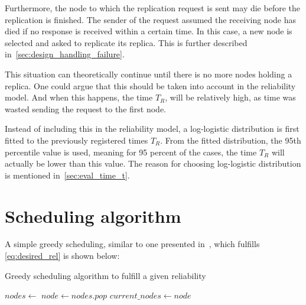 \documentclass{cslthse-msc}
\begin{document}
Furthermore, the node to which the replication request is sent may die before the replication is finished. The sender of the request assumed the receiving node has died if no response is received within a certain time. In this case, a new node is selected and asked to replicate its replica. This is further described in~\cref{sec:design_handling_failure}. 

This situation can theoretically continue until there is no more nodes holding a replica. One could argue that this should be taken into account in the reliability model. And when this happens, the time $T_R$, will be relatively high, as time was wasted sending the request to the first node. 

Instead of including this in the reliability model, a log-logistic distribution is first fitted to the previously registered times $T_R$. From the fitted distribution, the 95th percentile value is used, meaning for 95 percent of the cases, the time $T_R$ will actually be lower than this value. The reason for choosing log-logistic distribution is mentioned in~\cref{sec:eval_time_t}. %

\section{Scheduling algorithm} \label{sec:design_sched_alg}
A simple greedy scheduling, similar to one presented in~\cite{effTaskReplMobGrid}, which fulfills \cref{eq:desired_rel} is shown below:


\begin{algorithm}[H]
	\caption{Greedy scheduling algorithm to fulfill a given reliability} \label{alg:scheduling}
	\begin{algorithmic}[1]
	\Statex
	\State $nodes\gets $ 
		\State $node\gets nodes.pop$
		\State
		\State $current\_nodes\gets node$
	\EndWhile
	\EndProcedure
	\end{algorithmic}
\end{algorithm} 
\end{document}
